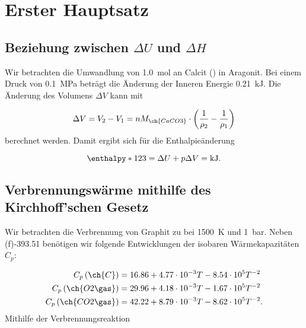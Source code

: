 \section{Erster Hauptsatz}

  \subsection{Beziehung zwischen $\Delta U$ und $\Delta H$}
  
    Wir betrachten die Umwandlung von \SI[mode=text]{1.0}{\mole} an Calcit () in Aragonit. Bei einem Druck von \SI[mode=text]{0.1}{MPa} beträgt die Änderung der Inneren Energie \SI[mode=text]{0.21}{\kilo\joule}. Die Änderung des Volumens $\Delta V$ kann mit 
    
    \begin{equation}
      \Delta V = V_2 - V_1 = n M_{\ch{CaCO3}} \cdot \left(\frac{1}{\rho_2} - \frac{1}{\rho_1}\right)
    \end{equation}
    berechnet werden. Damit ergibt sich für die Enthalpieänderung
    
    \begin{equation}
      \enthalpy*{123} = \Delta U + p \Delta V = \SI[mode=text]{}{\kilo\joule}.
    \end{equation}
    
  \subsection{Verbrennungswärme mithilfe des Kirchhoff'schen Gesetz}
  
    Wir betrachten die Verbrennung von Graphit zu  bei \SI[mode=text]{1500}{\kelvin} und \SI[mode=text]{1}{bar}. Neben \enthalpy(f){-393.51} benötigen wir folgende Entwicklungen der isobaren Wärmekapazitäten $C_p$:
    
    \begin{equation}
      \begin{split}
        C_p \left(\ch{C}\right) &= 16.86 + 4.77 \cdot 10^{-3} T - 8.54 \cdot 10^5 T^{-2} \\
        C_p \left(\ch{O2\gas}\right) &= 29.96 + 4.18 \cdot 10^{-3} T - 1.67 \cdot 10^5 T^{-2} \\
        C_p \left(\ch{CO2\gas}\right) &= 42.22 + 8.79 \cdot 10^{-3} T - 8.62 \cdot 10^5 T^{-2}.
      \end{split}
    \end{equation}
  Mithilfe der Verbrennungsreaktion 
  
